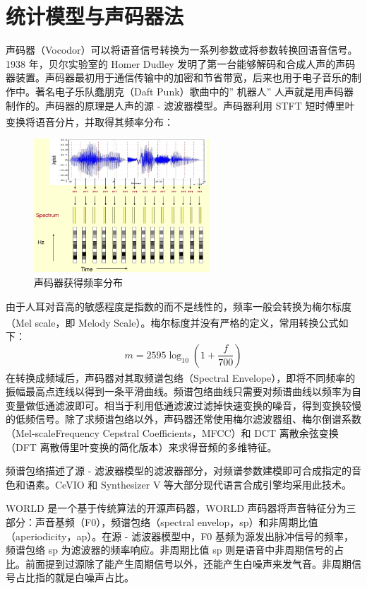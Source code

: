 \documentclass[12pt,a4paper]{ctexart}
\newcommand{\supercite}[1]{\textsuperscript{\cite{#1}}}
\begin{document}
\section{统计模型与声码器法}
声码器（Vocodor）可以将语音信号转换为一系列参数或将参数转换回语音信号。1938 年，贝尔实验室的 Homer Dudley 发明了第一台能够解码和合成人声的声码器装置。声码器最初用于通信传输中的加密和节省带宽，后来也用于电子音乐的制作中。著名电子乐队蠢朋克（Daft Punk）歌曲中的” 机器人” 人声就是用声码器制作的。声码器的原理是人声的源 - 滤波器模型。声码器利用 STFT 短时傅里叶变换将语音分片，并取得其频率分布\supercite{6}：
\begin{figure}[H]
    \centering
    \includegraphics[height=5cm]{figure2.png}
    \caption{声码器获得频率分布}
\end{figure}
由于人耳对音高的敏感程度是指数的而不是线性的，频率一般会转换为梅尔标度（Mel scale，即 Melody Scale）\supercite{7}。梅尔标度并没有严格的定义，常用转换公式如下：
\begin{equation*}
    m=2595\log_{10}(1+\frac{f}{700})
\end{equation*}
在转换成频域后，声码器对其取频谱包络（Spectral Envelope）\supercite{8}，即将不同频率的振幅最高点连线以得到一条平滑曲线。频谱包络曲线只需要对频谱曲线以频率为自变量做低通滤波即可。相当于利用低通滤波过滤掉快速变换的噪音，得到变换较慢的低频信号。除了求频谱包络以外，声码器还常使用梅尔滤波器组、梅尔倒谱系数（Mel-scaleFrequency Cepstral Coefficients，MFCC）和 DCT 离散余弦变换（DFT 离散傅里叶变换的简化版本）来求得音频的多维特征。

频谱包络描述了源 - 滤波器模型的滤波器部分，对频谱参数建模即可合成指定的音色和语素。CeVIO 和 Synthesizer V 等大部分现代语言合成引擎均采用此技术。

WORLD 是一个基于传统算法的开源声码器，WORLD 声码器将声音特征分为三部分：声音基频（F0），频谱包络（spectral envelop，sp）和非周期比值（aperiodicity，ap）。在源 - 滤波器模型中，F0 基频为源发出脉冲信号的频率，频谱包络 sp 为滤波器的频率响应。非周期比值 sp 则是语音中非周期信号的占比。前面提到过源除了能产生周期信号以外，还能产生白噪声来发气音。非周期信号占比指的就是白噪声占比。
\end{document}

